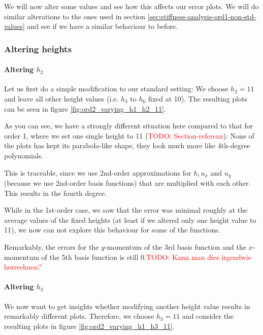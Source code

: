 \documentclass{article}
\newcommand{\todo}[1]{\textcolor{red}{TODO: #1}}
\begin{document}
We will now alter some values and see how this affects our error plots. We will do similar alterations to the ones used in section \ref{sec:stiffness-analysis-ord1-non-std-values} and see if we have a similar behaviour to before.

\subsubsection{Altering heights}
\label{sec:stiffness-analysis-ord2-nondefault-altering-heights}

\paragraph{Altering $h_2$}

Let us first do a simple modification to our standard setting: We choose $h_2=11$ and leave all other height values (i.e. $h_3$ to $h_6$ fixed at 10). The resulting plots can be seen in figure \ref{fig:ord2_varying_h1_h2_11}. 



As you can see, we have a strongly different situation here compared to that for order 1, where we set one single height to 11 (\todo{Section-referenz}): None of the plots has kept its parabola-like shape, they look much more like 4th-degree polynomials.

This is traceable, since we use 2nd-order approximations for $h, u_x$ and $u_y$ (because we use 2nd-order basis functions) that are multiplied with each other. This results in the fourth degree.

While in the 1st-order case, we saw that the error was minimal roughly at the average values of the fixed heights (at least if we altered only one height value to 11), we now can not explore this behaviour for some of the functions.

Remarkably, the errors for the $y$-momentum of the 3rd basis function and the $x$-momentum of the 5th basis function is still 0.\todo{Kann man dies irgendwie herrechnen?}

\paragraph{Altering $h_3$}

We now want to get insights whether modifying another height value results in remarkably different plots. Therefore, we choose $h_3=11$ and consider the resulting plots in figure \ref{fig:ord2_varying_h1_h3_11}.
\end{document}
